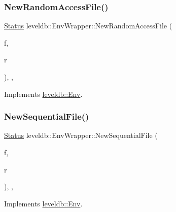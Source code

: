 \subsubsection{\texorpdfstring{NewRandomAccessFile()}{NewRandomAccessFile()}}
{\footnotesize\ttfamily \mbox{\hyperlink{classleveldb_1_1_status}{Status}} leveldb\+::\+Env\+Wrapper\+::\+New\+Random\+Access\+File (\begin{DoxyParamCaption}\item[{const std\+::string \&}]{f,  }\item[{\mbox{\hyperlink{classleveldb_1_1_random_access_file}{Random\+Access\+File}} $\ast$$\ast$}]{r }\end{DoxyParamCaption})\hspace{0.3cm}{\ttfamily [inline]}, {\ttfamily [override]}, {\ttfamily [virtual]}}



Implements \mbox{\hyperlink{classleveldb_1_1_env_a1df3e0bb2d47ee914448df9bb9ca0734}{leveldb\+::\+Env}}.

\mbox{\label{classleveldb_1_1_env_wrapper_a3681800d0263b7bc77a066fdfb69e005}} 
\subsubsection{\texorpdfstring{NewSequentialFile()}{NewSequentialFile()}}
{\footnotesize\ttfamily \mbox{\hyperlink{classleveldb_1_1_status}{Status}} leveldb\+::\+Env\+Wrapper\+::\+New\+Sequential\+File (\begin{DoxyParamCaption}\item[{const std\+::string \&}]{f,  }\item[{\mbox{\hyperlink{classleveldb_1_1_sequential_file}{Sequential\+File}} $\ast$$\ast$}]{r }\end{DoxyParamCaption})\hspace{0.3cm}{\ttfamily [inline]}, {\ttfamily [override]}, {\ttfamily [virtual]}}



Implements \mbox{\hyperlink{classleveldb_1_1_env_ad73810059f48c1d7b91125d357e7d351}{leveldb\+::\+Env}}.

\mbox{\label{classleveldb_1_1_env_wrapper_a3e4991deec0666b177cf0f699efa2ca8}} 
